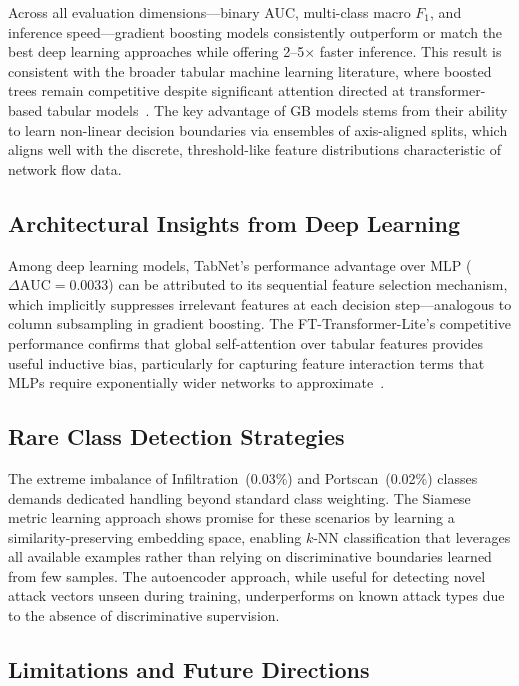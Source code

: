 \documentclass[conference]{IEEEtran}
\begin{document}
Across all evaluation dimensions—binary AUC, multi-class macro $F_1$, and
inference speed—gradient boosting models consistently outperform or match the
best deep learning approaches while offering 2--5$\times$ faster inference.
This result is consistent with the broader tabular machine learning literature,
where boosted trees remain competitive despite significant attention directed
at transformer-based tabular models~\cite{gorishniy2021}.  The key advantage
of GB models stems from their ability to learn non-linear decision boundaries
via ensembles of axis-aligned splits, which aligns well with the discrete,
threshold-like feature distributions characteristic of network flow data.

\subsection{Architectural Insights from Deep Learning}

Among deep learning models, TabNet's performance advantage over MLP
($\Delta\text{AUC}=0.0033$) can be attributed to its sequential feature
selection mechanism, which implicitly suppresses irrelevant features at each
decision step—analogous to column subsampling in gradient boosting.
The FT-Transformer-Lite's competitive performance confirms that global
self-attention over tabular features provides useful inductive bias,
particularly for capturing feature interaction terms that MLPs require
exponentially wider networks to approximate~\cite{gorishniy2021}.

\subsection{Rare Class Detection Strategies}

The extreme imbalance of Infiltration~(0.03\%) and Portscan~(0.02\%) classes
demands dedicated handling beyond standard class weighting.  The Siamese
metric learning approach shows promise for these scenarios by learning a
similarity-preserving embedding space, enabling $k$-NN classification that
leverages all available examples rather than relying on discriminative
boundaries learned from few samples.  The autoencoder approach, while useful
for detecting novel attack vectors unseen during training, underperforms on
known attack types due to the absence of discriminative supervision.

\subsection{Limitations and Future Directions}
\end{document}

